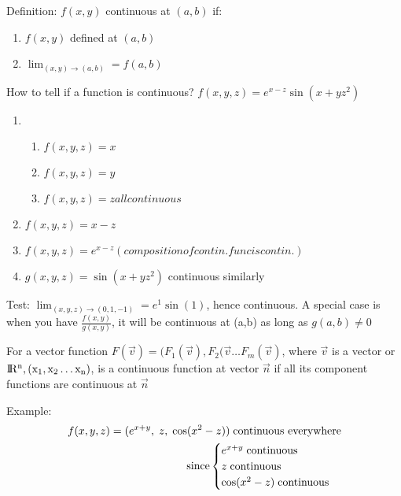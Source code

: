 \documentclass{article}
\newcommand{\R}{\rm I\!R}
\begin{document}
        Definition: $f(x,y)$ continuous at $(a,b)$ if:
        \begin{enumerate}
            \item $f(x,y)$ defined at $(a,b)$
            \item $\lim_{(x,y)\rightarrow(a,b)} = f(a,b)$
        \end{enumerate}
        How to tell if a function is continuous?
        $f(x,y,z) = e^{x-z}\sin(x+yz^2)$
        \begin{enumerate}
            \item \begin{enumerate}
                    \item $f(x,y,z) = x$
                    \item $f(x,y,z) = y$
                    \item $f(x,y,z) = z all continuous$
                \end{enumerate}
            \item $f(x,y,z) = x-z$
            \item $f(x,y,z) = e^{x-z}(composition of contin.func is contin.)$
            \item $g(x,y,z) = \sin(x+yz^2)$ continuous similarly
        \end{enumerate}
        Test: $\lim_{(x,y,z)\rightarrow(0,1,-1)} = e^1\sin{(1)}$, hence continuous. A special case is when you have $\frac{f(x,y)}{g(x,y)}$, it will be continuous at (a,b) as long as $g(a,b) \neq 0$
        
        For a vector function $F(\vec{v}) = (F_1(\vec{v}),F_2(\vec{v}\dots F_m(\vec{v})$, where $\vec{v}$ is a vector or $\R^n, (x_1,x_2\dots x_n)$, is a continuous function at vector $\vec{n}$ if all its component functions are continuous at $\vec{n}$
        
        Example:
        \begin{align}
            f(x,y,z) = (e^{x+y},\;z,\;\cos(x^2-z)) \text{\;continuous everywhere}\\
            \text{since}\begin{cases}
                e^{x+y} \text{\;continuous} \\
                z \text{\;continuous} \\
                \cos(x^2-z) \text{\;continuous}
            \end{cases}
        \end{align}
    
\end{document}
